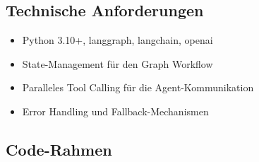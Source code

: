 \subsection*{Technische Anforderungen}
\begin{itemize}[leftmargin=*]
    \item Python 3.10+, langgraph, langchain, openai
    \item State-Management für den Graph Workflow
    \item Paralleles Tool Calling für die Agent-Kommunikation
    \item Error Handling und Fallback-Mechanismen
\end{itemize}

\subsection*{Code-Rahmen}

